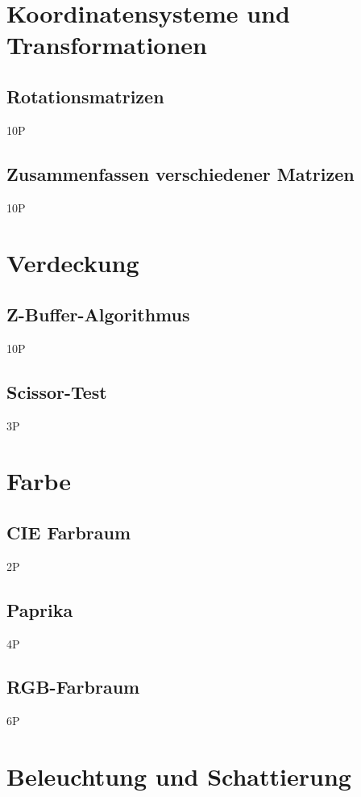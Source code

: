 \documentclass{article}
\def\points#1{\begin{flushright}#1\end{flushright}}
\begin{document}
\section{Koordinatensysteme und Transformationen}
\subsection{Rotationsmatrizen}
 \points{10P}

\subsection{Zusammenfassen verschiedener Matrizen}
 \points{10P}

\section{Verdeckung}
\subsection{Z-Buffer-Algorithmus}
 \points{10P}

\subsection{Scissor-Test}
 \points{3P}

\section{Farbe}
\subsection{CIE Farbraum}
 \points{2P}
\subsection{Paprika}
 \points{4P}
\subsection{RGB-Farbraum}
 \points{6P}

\section{Beleuchtung und Schattierung}
\end{document}

